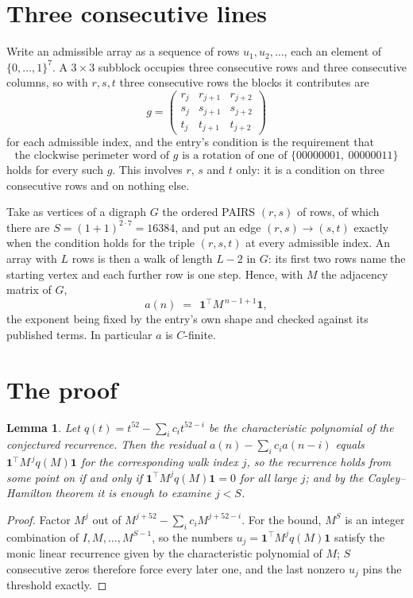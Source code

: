 \documentclass[11pt,a4paper]{article}
\theoremstyle{plain}
\newtheorem{lemma}[theorem]{Lemma}
\theoremstyle{definition}
\begin{document}
\section{Three consecutive lines}

Write an admissible array as a sequence of rows $u_1,u_2,\dots$, each an element of
$\{0,\dots,1\}^{7}$. A $3\times3$ subblock occupies three consecutive rows and
three consecutive columns, so with $r,s,t$ three consecutive rows the blocks it
contributes are
\[
g=\begin{pmatrix}r_j&r_{j+1}&r_{j+2}\\ s_j&s_{j+1}&s_{j+2}\\ t_j&t_{j+1}&t_{j+2}\end{pmatrix}
\]
for each admissible index, and the entry's condition is the requirement that
\[
\text{the clockwise perimeter word of }g\text{ is a rotation of one of }\{00000001,\ 00000011\}
\]
holds for every such $g$. This involves $r$, $s$ and $t$ only: it is a condition on
three consecutive rows and on nothing else.

Take as vertices of a digraph $G$ the ordered PAIRS $(r,s)$ of rows, of which there are
$S=(1+1)^{2\cdot7}=16384$, and put an edge $(r,s)\to(s,t)$ exactly when the condition
holds for the triple $(r,s,t)$ at every admissible index. An array with $L$ rows is then a
walk of length $L-2$ in $G$: its first two rows name the starting vertex and each further
row is one step. Hence, with $M$ the adjacency matrix of $G$,
\[
a(n)\;=\;\,\mathbf{1}^{\!\top}M^{\,n-1+1}\mathbf{1},
\]
the exponent being fixed by the entry's own shape and checked against its published terms.
In particular $a$ is $C$-finite.

\section{The proof}

\begin{lemma}\label{lem:crit}
Let $q(t)=t^{52}-\sum_i c_it^{52-i}$ be the characteristic polynomial of the
conjectured recurrence. Then the residual $a(n)-\sum_ic_ia(n-i)$ equals
$\mathbf{1}^{\!\top}M^{\,j}q(M)\mathbf{1}$ for the corresponding walk index
$j$, so the recurrence holds from some point on if and only if
$\mathbf{1}^{\!\top}M^{j}q(M)\mathbf{1}=0$ for all large $j$; and by the
Cayley--Hamilton theorem it is enough to examine $j<S$.
\end{lemma}

\begin{proof}
Factor $M^{j}$ out of $M^{j+52}-\sum_ic_iM^{j+52-i}$. For the bound, $M^{S}$
is an integer combination of $I,M,\dots,M^{S-1}$, so the numbers
$u_j=\mathbf{1}^{\!\top}M^{j}q(M)\mathbf{1}$ satisfy the monic linear recurrence given by
the characteristic polynomial of $M$; $S$ consecutive zeros therefore force every later one,
and the last nonzero $u_j$ pins the threshold exactly.
\end{proof}
\end{document}
